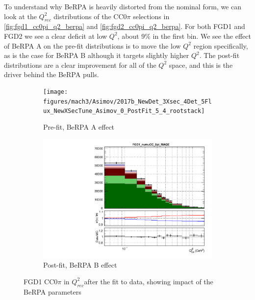 To understand why BeRPA is heavily distorted from the nominal form, we can look at the $Q^2_{rec}$ distributions of the CC0$\pi$ selections in \autoref{fig:fgd1_cc0pi_q2_berpa} and \autoref{fig:fgd2_cc0pi_q2_berpa}. For both FGD1 and FGD2 we see a clear deficit at low $Q^2$, about 9\% in the first bin. We see the effect of BeRPA A on the pre-fit distributions is to move the low $Q^2$ region specifically, as is the case for BeRPA B although it targets slightly higher $Q^2$. The post-fit distributions are a clear improvement for all of the $Q^2$ space, and this is the driver behind the BeRPA pulls.

\begin{figure}[h]
		\begin{subfigure}[t]{0.49\textwidth}
			\texttt{[image: figures/mach3/Asimov/2017b\_NewDet\_3Xsec\_4Det\_5Flux\_NewXSecTune\_Asimov\_0\_PostFit\_5\_4\_rootstack]}
			\caption{Pre-fit, BeRPA A effect}
		\end{subfigure}
		\begin{subfigure}[t]{0.49\textwidth}
			\includegraphics[width=\textwidth, trim={0mm 0mm 0mm 6mm}, clip,page=15]{figures/mach3/data/postfit/2017b_NewData_NewDet_UpdXsecStep_2Xsec_4Det_5Flux_0_PostFit_5_4_rootstack}
			\caption{Post-fit, BeRPA B effect}
		\end{subfigure}
		\caption{FGD1 CC$0\pi$ in $Q^2_{rec}$after the fit to data, showing impact of the BeRPA parameters}
		\label{fig:fgd1_cc0pi_q2_berpa}
\end{figure}

